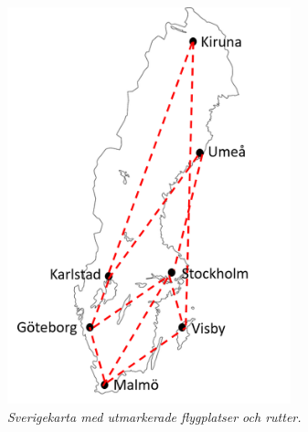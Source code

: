 \begin{figure}
    \hspace{0.4cm}
    \begin{subfigure}[b]{0.45\textwidth}
        \centering
        \includegraphics[width=0.9\textwidth]{Figures/Flygplan_rapport.png}
        \caption{\textsl{Sverigekarta med utmarkerade flygplatser och rutter.}}
        \label{fig:Flygplan}
    \end{subfigure}
    \hfill
    \begin{subfigure}[b]{0.45\textwidth}
        \centering

\end{subfigure}
\end{figure}
